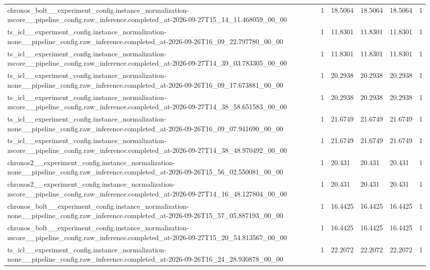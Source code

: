 \begin{tabular}{llllll}
chronos\_bolt\_\_experiment\_config.instance\_normalization-zscore\_\_pipeline\_config.raw\_inference.completed\_at-2026-09-27T15\_14\_11.468059\_00\_00 & 1 & 18.5064 & 18.5064 & 18.5064 & 1 \\
ts\_icl\_\_experiment\_config.instance\_normalization-none\_\_pipeline\_config.raw\_inference.completed\_at-2026-09-26T16\_09\_22.797780\_00\_00 & 1 & 11.8301 & 11.8301 & 11.8301 & 1 \\
ts\_icl\_\_experiment\_config.instance\_normalization-zscore\_\_pipeline\_config.raw\_inference.completed\_at-2026-09-27T14\_39\_03.783305\_00\_00 & 1 & 11.8301 & 11.8301 & 11.8301 & 1 \\
ts\_icl\_\_experiment\_config.instance\_normalization-none\_\_pipeline\_config.raw\_inference.completed\_at-2026-09-26T16\_09\_17.673881\_00\_00 & 1 & 20.2938 & 20.2938 & 20.2938 & 1 \\
ts\_icl\_\_experiment\_config.instance\_normalization-zscore\_\_pipeline\_config.raw\_inference.completed\_at-2026-09-27T14\_38\_58.651583\_00\_00 & 1 & 20.2938 & 20.2938 & 20.2938 & 1 \\
ts\_icl\_\_experiment\_config.instance\_normalization-none\_\_pipeline\_config.raw\_inference.completed\_at-2026-09-26T16\_09\_07.941690\_00\_00 & 1 & 21.6749 & 21.6749 & 21.6749 & 1 \\
ts\_icl\_\_experiment\_config.instance\_normalization-zscore\_\_pipeline\_config.raw\_inference.completed\_at-2026-09-27T14\_38\_48.970492\_00\_00 & 1 & 21.6749 & 21.6749 & 21.6749 & 1 \\
chronos2\_\_experiment\_config.instance\_normalization-none\_\_pipeline\_config.raw\_inference.completed\_at-2026-09-26T15\_56\_02.550081\_00\_00 & 1 & 20.431 & 20.431 & 20.431 & 1 \\
chronos2\_\_experiment\_config.instance\_normalization-zscore\_\_pipeline\_config.raw\_inference.completed\_at-2026-09-27T14\_16\_48.127804\_00\_00 & 1 & 20.431 & 20.431 & 20.431 & 1 \\
chronos\_bolt\_\_experiment\_config.instance\_normalization-none\_\_pipeline\_config.raw\_inference.completed\_at-2026-09-26T15\_57\_05.887193\_00\_00 & 1 & 16.4425 & 16.4425 & 16.4425 & 1 \\
chronos\_bolt\_\_experiment\_config.instance\_normalization-zscore\_\_pipeline\_config.raw\_inference.completed\_at-2026-09-27T15\_20\_54.813567\_00\_00 & 1 & 16.4425 & 16.4425 & 16.4425 & 1 \\
ts\_icl\_\_experiment\_config.instance\_normalization-none\_\_pipeline\_config.raw\_inference.completed\_at-2026-09-26T16\_24\_28.930878\_00\_00 & 1 & 22.2072 & 22.2072 & 22.2072 & 1 \\

\end{tabular}
